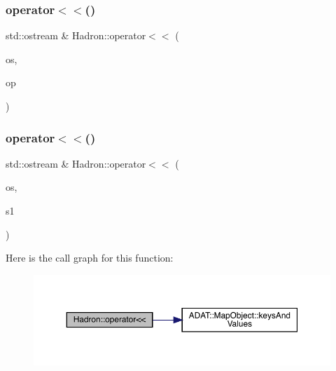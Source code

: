 \subsubsection{\texorpdfstring{operator$<$$<$()}{operator<<()}\hspace{0.1cm}{\footnotesize\ttfamily [47/48]}}
{\footnotesize\ttfamily std\+::ostream \& Hadron\+::operator$<$$<$ (\begin{DoxyParamCaption}\item[{std\+::ostream \&}]{os,  }\item[{const \mbox{\hyperlink{structHadron_1_1KeySingleHadronQuarkFlavorColor__t}{Key\+Single\+Hadron\+Quark\+Flavor\+Color\+\_\+t}} \&}]{op }\end{DoxyParamCaption})}

\mbox{\label{namespaceHadron_aa68c7efacb8bc21a4d87aede8544def5}} 
\subsubsection{\texorpdfstring{operator$<$$<$()}{operator<<()}\hspace{0.1cm}{\footnotesize\ttfamily [48/48]}}
{\footnotesize\ttfamily std\+::ostream \& Hadron\+::operator$<$$<$ (\begin{DoxyParamCaption}\item[{std\+::ostream \&}]{os,  }\item[{const \mbox{\hyperlink{namespaceHadron_a03b319764f85c20434f20a269ce5f388}{Map\+Single\+Hadron\+Quark\+Flavor\+Color\+Spin\+\_\+t}} \&}]{s1 }\end{DoxyParamCaption})}

Here is the call graph for this function\+:
\nopagebreak
\begin{figure}[H]
\begin{center}
\leavevmode
\includegraphics[width=350pt]{d1/daf/namespaceHadron_aa68c7efacb8bc21a4d87aede8544def5_cgraph}
\end{center}
\end{figure}
\mbox{\label{namespaceHadron_a6a6810ed7f262fbb4167534023c0b191}} 
